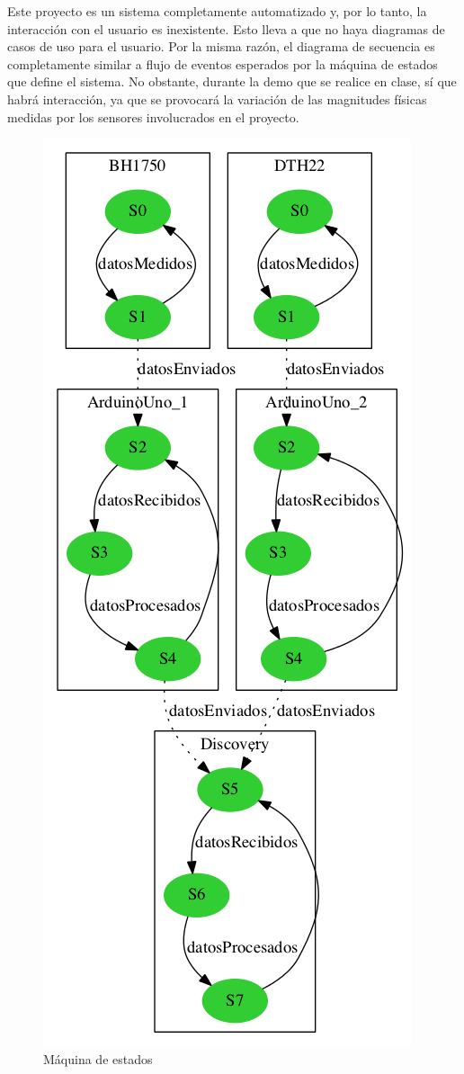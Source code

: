 Este proyecto es un sistema completamente automatizado y, por lo
tanto, la interacci\'on con el usuario es inexistente. Esto lleva a
que no haya diagramas de casos de uso para el usuario. Por la misma
raz\'on, el diagrama de secuencia es completamente similar a flujo de
eventos esperados por la m\'aquina de estados que define el sistema.
No obstante, durante la demo que se realice en clase, s\'i que habr\'a
interacci\'on, ya que se provocar\'a la variaci\'on de las magnitudes
f\'isicas medidas por los sensores involucrados en el proyecto.
\begin{center}
\begin{figure}[h]\label{fig:statemachine}
\hspace{3.5cm}
\includegraphics[scale=0.5]{images/maquina_estados.png}
\caption{M\'aquina de estados}
\end{figure}
\end{center}
